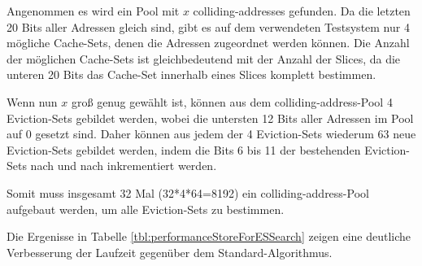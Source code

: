 Angenommen es wird ein Pool mit $x$ colliding-addresses gefunden.
Da die letzten 20 Bits aller Adressen gleich sind, gibt es auf dem verwendeten Testsystem nur 4 mögliche Cache-Sets, denen die Adressen zugeordnet werden können.
Die Anzahl der möglichen Cache-Sets ist gleichbedeutend mit der Anzahl der Slices, da die unteren 20 Bits das Cache-Set innerhalb eines Slices komplett bestimmen.

Wenn nun $x$ groß genug gewählt ist, können aus dem colliding-address-Pool 4 Eviction-Sets gebildet werden, wobei die untersten 12 Bits aller Adressen im Pool auf 0 gesetzt sind. Daher können aus jedem der 4 Eviction-Sets wiederum 63 neue Eviction-Sets gebildet werden, indem die Bits 6 bis 11 der bestehenden Eviction-Sets nach und nach inkrementiert werden.

Somit muss insgesamt 32 Mal (32*4*64=8192) ein colliding-address-Pool aufgebaut werden, um alle Eviction-Sets zu bestimmen.

Die Ergenisse in Tabelle \ref{tbl:performanceStoreForESSearch} zeigen eine deutliche Verbesserung der Laufzeit gegenüber dem Standard-Algorithmus.

